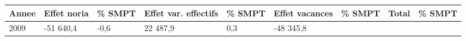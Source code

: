 \begin{longtable}[]{@{}lllllllll@{}}
\toprule
\begin{minipage}[b]{0.05\columnwidth}\raggedright
Annee\strut
\end{minipage} & \begin{minipage}[b]{0.10\columnwidth}\raggedright
Effet noria\strut
\end{minipage} & \begin{minipage}[b]{0.06\columnwidth}\raggedright
\% SMPT\strut
\end{minipage} & \begin{minipage}[b]{0.16\columnwidth}\raggedright
Effet var. effectifs\strut
\end{minipage} & \begin{minipage}[b]{0.06\columnwidth}\raggedright
\% SMPT\strut
\end{minipage} & \begin{minipage}[b]{0.12\columnwidth}\raggedright
Effet vacances\strut
\end{minipage} & \begin{minipage}[b]{0.06\columnwidth}\raggedright
\% SMPT\strut
\end{minipage} & \begin{minipage}[b]{0.09\columnwidth}\raggedright
Total\strut
\end{minipage} & \begin{minipage}[b]{0.06\columnwidth}\raggedright
\% SMPT\strut
\end{minipage}\tabularnewline
\midrule
\endhead
\begin{minipage}[t]{0.05\columnwidth}\raggedright
2009\strut
\end{minipage} & \begin{minipage}[t]{0.10\columnwidth}\raggedright
-51 640,4\strut
\end{minipage} & \begin{minipage}[t]{0.06\columnwidth}\raggedright
-0,6\strut
\end{minipage} & \begin{minipage}[t]{0.16\columnwidth}\raggedright
22 487,9\strut
\end{minipage} & \begin{minipage}[t]{0.06\columnwidth}\raggedright
0,3\strut
\end{minipage} & \begin{minipage}[t]{0.12\columnwidth}\raggedright
-48 345,8\strut
\end{minipage} & \begin{minipage}[t]{0.06\columnwidth}\raggedright

\end{minipage}
\end{longtable}
